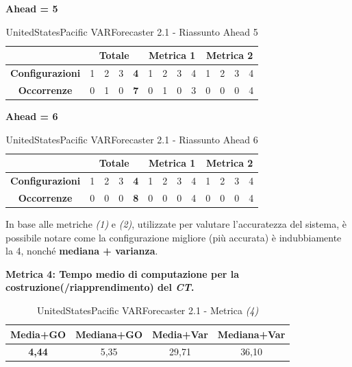 \documentclass[12pt,a4paper,oneside,openright]{book}
\begin{document}
\medskip
\textbf{Ahead = 5}


\begin{table}[H]
\centering
\begin{tabular}{|c|c|c|c|c|c|c|c|c|c|c|c|c|}
\hline
 & \multicolumn{4}{|c|}{\textbf{Totale}} & \multicolumn{4}{|c|}{\textbf{Metrica 1}} & \multicolumn{4}{|c|}{\textbf{Metrica 2}} \\
\hline
\textbf{Configurazioni} & 1 & 2 & 3 & \textbf{4} & 1 & 2 & 3 & 4 & 1 & 2 & 3 & 4 \\
\hline
\textbf{Occorrenze} & 0 & 1 & 0 & \textbf{7} & 0 & 1 & 0 & 3 & 0 & 0 & 0 & 4\\
\hline
\end{tabular}
\caption{UnitedStatesPacific VARForecaster 2.1 - Riassunto Ahead 5}
\end{table}

\medskip
\textbf{Ahead = 6}


\begin{table}[H]
\centering
\begin{tabular}{|c|c|c|c|c|c|c|c|c|c|c|c|c|}
\hline
 & \multicolumn{4}{|c|}{\textbf{Totale}} & \multicolumn{4}{|c|}{\textbf{Metrica 1}} & \multicolumn{4}{|c|}{\textbf{Metrica 2}} \\
\hline
\textbf{Configurazioni} & 1 & 2 & 3 & \textbf{4} & 1 & 2 & 3 & 4 & 1 & 2 & 3 & 4 \\
\hline
\textbf{Occorrenze} & 0 & 0 & 0 & \textbf{8} & 0 & 0 & 0 & 4 & 0 & 0 & 0 & 4\\
\hline
\end{tabular}
\caption{UnitedStatesPacific VARForecaster 2.1 - Riassunto Ahead 6}
\end{table} 

\medskip

In base alle metriche \textit{(1)} e \textit{(2)}, utilizzate per valutare l'accuratezza del sistema, è possibile notare come la configurazione migliore (più accurata) è indubbiamente la 4, nonché \textbf{mediana + varianza}.

\medskip

\textbf{Metrica 4: Tempo medio di computazione per la costruzione(/riapprendimento) del \textit{CT}.}

\medskip


\begin{table}[H]
\centering
\begin{tabular}[H]{|c|c|c|c|}
\hline
\textbf{Media+GO} & \textbf{Mediana+GO} & \textbf{Media+Var} & \textbf{Mediana+Var} \\
\hline
\textbf{4,44} & 5,35 & 29,71 & 36,10 \\
\hline
\end{tabular}
\caption{UnitedStatesPacific VARForecaster 2.1 - Metrica \textit{(4)}}
\end{table} 
\end{document}
